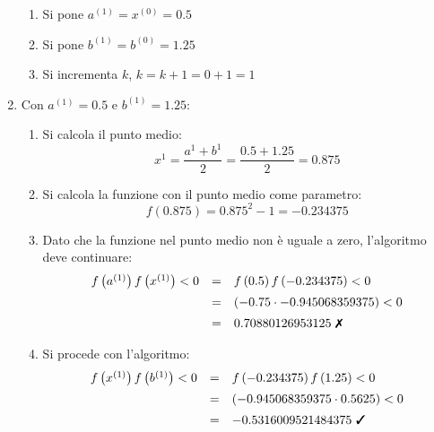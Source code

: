 \documentclass[a4paper]{article}
\begin{document}
\begin{examplebox}
\begin{enumerate}
\begin{enumerate}
                \item Si pone $a^{(1)} = x^{(0)} = 0.5$

                \item Si pone $b^{(1)} = b^{(0)} = 1.25$

                \item Si incrementa $k$, $k = k + 1 = 0 + 1 = 1$
            \end{enumerate}

            \item Con $a^{(1)} = 0.5$ e $b^{(1)} = 1.25$:
            \begin{enumerate}
                \item Si calcola il punto medio:
                \begin{equation*}
                    x^{1} = \dfrac{a^{1} + b^{1}}{2} = \dfrac{0.5 + 1.25}{2} = 0.875
                \end{equation*}

                \item Si calcola la funzione con il punto medio come parametro:
                \begin{equation*}
                    f\left(0.875\right) = 0.875^{2} - 1 = -0.234375
                \end{equation*}

                \item Dato che la funzione nel punto medio non è uguale a zero, l'algoritmo deve continuare:
                \begin{equation*}
                    \begin{array}{rcl}
                        f\left(a^{(1)}\right)f\left(x^{(1)}\right) < 0 &=& f\left(0.5\right)f\left(-0.234375\right) < 0 \\ [.5em]
                        &=& \left(-0.75 \cdot -0.945068359375\right) < 0 \\ [.5em]
                        &=& 0.70880126953125 \text{ \ding{55}}
                    \end{array}
                \end{equation*}
                
                \item Si procede con l'algoritmo:
                \begin{equation*}
                    \begin{array}{rcl}
                        f\left(x^{(1)}\right)f\left(b^{(1)}\right) < 0 &=& f\left(-0.234375\right)f\left(1.25\right) < 0 \\ [.5em]
                        &=& \left(-0.945068359375 \cdot 0.5625\right) < 0 \\ [.5em]
                        &=& -0.5316009521484375 \text{ \ding{51}}
                    \end{array}
                \end{equation*}


\end{enumerate}
\end{enumerate}
\end{examplebox}
\end{document}

